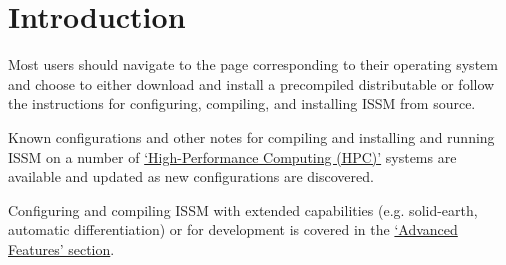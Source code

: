 
\section{Introduction} \label{sec:installation-introduction}
Most users should navigate to the page corresponding to their operating system and choose to either download and install a precompiled distributable or follow the instructions for configuring, compiling, and installing ISSM from source.

Known configurations and other notes for compiling and installing and running ISSM on a number of 
\hyperref[sec:installation-hpc]{`High-Performance Computing (HPC)'}
systems are available and updated as new configurations are discovered.

Configuring and compiling ISSM with extended capabilities (e.g. solid-earth, automatic differentiation) or for development is covered in the
\hyperref[sec:installation-advanced]{`Advanced Features' section}.

